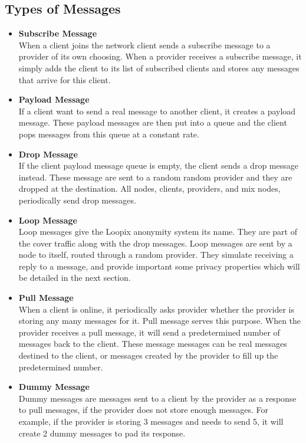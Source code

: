 \documentclass[a4paper,11pt,oneside]{report}
\begin{document}
\subsection{Types of Messages}
\begin{itemize}
    \item \textbf{Subscribe Message} \\
    When a client joins the network client sends a subscribe message to a provider of its own choosing. When a provider receives a subscribe message, it simply adds the client to its list of subscribed clients and stores any messages that arrive for this client.
    \item \textbf{Payload Message} \\
    If a client want to send a real message to another client, it creates a payload message. These payload messages are then put into a queue and the client pops messages from this queue at a constant rate.
    \item \textbf{Drop Message} \\
    If the client payload message queue is empty, the client sends a drop message instead. These message are sent to a random random provider and they are dropped at the destination. All nodes, clients, providers, and mix nodes, periodically send drop messages.
    \item \textbf{Loop Message} \\
    Loop messages give the Loopix anonymity system its name. They are part of the cover traffic along with the drop messages. Loop messages are sent by a node to itself, routed through a random provider. They simulate receiving a reply to a message, and provide important some privacy properties which will be detailed in the next section.
    \item \textbf{Pull Message} \\
    When a client is online, it periodically asks provider whether the provider is storing any many messages for it. Pull message serves this purpose. When the provider receives a pull message, it will send a predetermined number of messages back to the client. These message messages can be real messages destined to the client, or messages created by the provider to fill up the predetermined number.
    \item \textbf{Dummy Message} \\
    Dummy messages are messages sent to a client by the provider as a response to pull messages, if the provider does not store enough messages. For example, if the provider is storing 3 messages and needs to send 5, it will create 2 dummy messages to pad its response.
\end{itemize}
\end{document}

